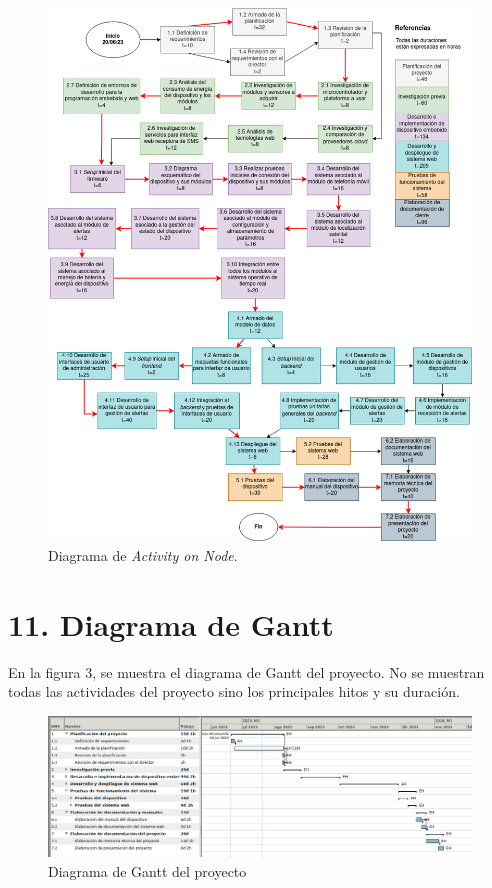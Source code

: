 \documentclass[
11pt, %
]{charter}
\begin{document}
\begin{figure}[htpb]
\centering 
\includegraphics[width=.9\textwidth]{./Figuras/AoN.png}
\caption{Diagrama de \textit{Activity on Node}.}
\label{fig:AoN}
\end{figure}

\section{11. Diagrama de Gantt}
\label{sec:gantt}



En la figura 3, se muestra el diagrama de Gantt del proyecto. No se muestran todas las actividades del proyecto sino los principales hitos y su duración. 


\begin{figure}[htpb]
\centering 
\includegraphics[width=1\textwidth]{./Figuras/Gantt.png}
\caption{Diagrama de Gantt del proyecto}
\label{fig:diagGantt}
\end{figure}
\end{document}
